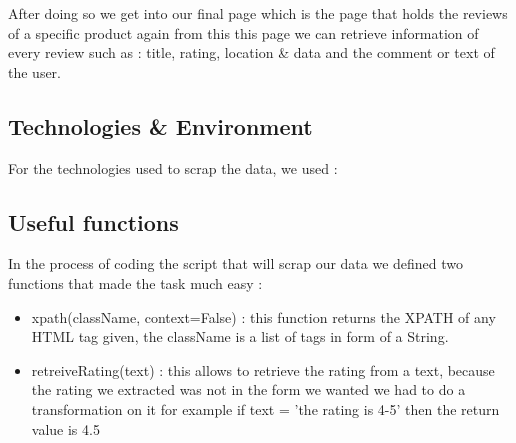After doing so we get into our final page which is the page that holds the reviews of a specific product again from this this page we can retrieve information of every review such as : title, rating, location \& data and the comment or text of the user.
\subsection{Technologies \& Environment}

For the technologies used to scrap the data, we used :


\subsection{Useful functions}
In the process of coding the script that will scrap our data we defined two functions that made the task much easy :
\begin{itemize}
    \item xpath(className, context=False) : this function returns the XPATH of any HTML tag given, the className is a list of tags in form of a String.
    \item retreiveRating(text) : this allows to retrieve the rating from a text, because the rating we extracted was not in the form we wanted we had to do a transformation on it for example if text = 'the rating is 4-5' then the return value is 4.5
\end{itemize}

